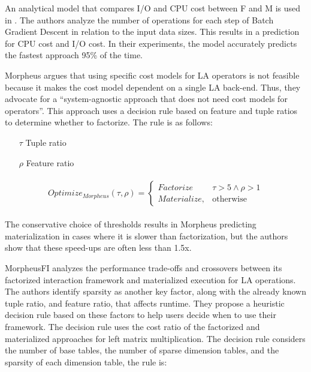 An analytical model that compares I/O and CPU cost between F and M is used in \cite{orion_learning_gen_lin_models}. The authors analyze the number of operations for each step of Batch Gradient Descent in relation to the input data sizes. This results in a prediction for CPU cost and I/O cost. In their experiments, the model accurately predicts the fastest approach 95\% of the time.


Morpheus \cite{morpheus} argues that using specific cost models for LA operators is not feasible because it makes the cost model dependent on a single LA back-end. Thus, they advocate for a “system-agnostic approach that does not need cost models for operators”. This approach uses a decision rule based on feature and tuple ratios to determine whether to factorize. The rule is as follows:

\begin{definition}
    \begin{itemize}
        \item[]
        \item[$\tau$] Tuple ratio
        \item[$\rho$] Feature ratio
    \end{itemize}

    \begin{align*}
        \begin{split}
            Optimize_{Morpheus}(\tau, \rho) =
            \begin{cases}
                Factorize    & \tau > 5 \wedge \rho > 1 \\
                Materialize, & \text{otherwise}
            \end{cases}
        \end{split}
    \end{align*}
\end{definition}

The conservative choice of thresholds results in Morpheus predicting materialization in cases where it is slower than factorization, but the authors show that these speed-ups are often less than 1.5x.

MorpheusFI \cite{MorpheusFIEnablingOptimizingNonlinear2019} analyzes the performance trade-offs and crossovers between its factorized interaction framework and materialized execution for LA operations. The authors identify sparsity as another key factor, along with the already known tuple ratio, and feature ratio, that affects runtime. They propose a heuristic decision rule based on these factors to help users decide when to use their framework. The decision rule uses the cost ratio of the factorized and materialized approaches for left matrix multiplication. The decision rule considers the number of base tables, the number of sparse dimension tables, and the sparsity of each dimension table, the rule is:


